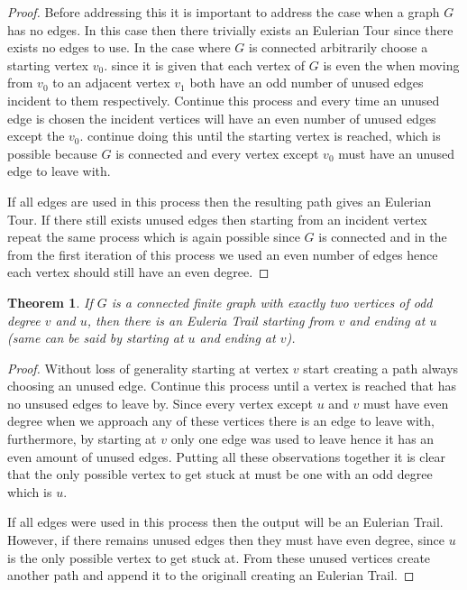 \documentclass{article}
\newtheorem{theorem}{Theorem}[section]
\begin{document}
\begin{proof}
  Before addressing this it is important to address the case when a graph $G$ has no edges. In this case then there trivially exists an Eulerian Tour since there exists no edges to use. In the case where $G$ is connected arbitrarily choose a starting vertex $v_{0}$. since it is given that each vertex of $G$ is even the when moving from $v_{0}$ to an adjacent vertex $v_{1}$ both have an odd number of unused edges incident to them respectively. Continue this process and every time an unused edge is chosen the incident vertices will have an even number of unused edges except the $v_{0}$. continue doing this until the starting vertex is reached, which is possible because $G$ is connected and every vertex except $v_{0}$ must have an unused edge to leave with.

  If all edges are used in this process then the resulting path gives an Eulerian Tour. If there still exists unused edges then starting from an incident vertex repeat the same process which is again possible since $G$ is connected and in the from the first iteration of this process we used an even number of edges hence each vertex should still have an even degree.
\end{proof}


\begin{theorem}
If $G$ is a connected finite graph with exactly two vertices of odd degree $v$ and $u$, then there is an Euleria Trail starting from $v$ and ending at $u$ (same can be said by starting at $u$ and ending at $v$).
\end{theorem}


\begin{proof}
  Without loss of generality starting at vertex $v$ start creating a path always choosing an unused edge. Continue this process until a vertex is reached that has no unsused edges to leave by. Since every vertex except $u$ and $v$ must have even degree when we approach any of these vertices there is an edge to leave with, furthermore, by starting at $v$ only one edge was used to leave hence it has an even amount of unused edges. Putting all these observations together it is clear that the only possible vertex to get stuck at must be one with an odd degree which is $u$.

  If all edges were used in this process then the output will be an Eulerian Trail. However, if there remains unused edges then they must have even degree, since $u$ is the only possible vertex to get stuck at. From these unused vertices create another path and append it to the originall creating an Eulerian Trail.
\end{proof}
\end{document}
